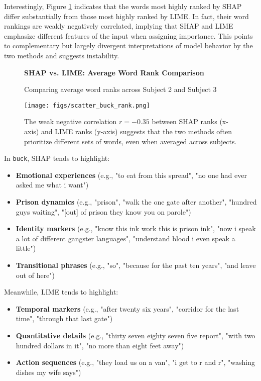 \documentclass[10pt,letterpaper]{article}
\begin{document}
Interestingly, Figure \ref{fig:scatter_buck_2} indicates that the words most highly ranked by SHAP differ substantially from those most highly ranked by LIME. In fact, their word rankings are weakly negatively correlated, implying that SHAP and LIME emphasize different features of the input when assigning importance. This points to complementary but largely divergent interpretations of model behavior by the two methods and suggests instability.

\begin{figure}[ht]
    \centering

    \parbox{\textwidth}{\centering 
        \fontsize{13pt}{13pt}\selectfont \textbf{SHAP vs. LIME: Average Word Rank Comparison}  
        
        {\fontsize{11pt}{13pt}\selectfont Comparing average word ranks across Subject 2 and Subject 3} 
    }
  
    \texttt{[image: figs/scatter\_buck\_rank.png]}
    
    \caption{The weak negative correlation $r = -0.35$ between SHAP ranks (x-axis) and LIME ranks (y-axis) suggests that the two methods often prioritize different sets of words, even when averaged across subjects.}
    \label{fig:scatter_buck_2}
\end{figure}


In \texttt{buck}, SHAP tends to highlight:
\begin{itemize}
	\item \textbf{Emotional experiences} (e.g., "to eat from this spread", "no one had ever asked me what i want")
	\item \textbf{Prison dynamics} (e.g., "prison", "walk the one gate after another", "hundred guys waiting", "[out] of prison they know you on parole")
	\item \textbf{Identity markers} (e.g., "know this ink work this is prison ink", "now i speak a lot of different gangster languages", "understand blood i even speak a little")
	\item \textbf{Transitional phrases} (e.g., "so", "because for the past ten years", "and leave out of here")
\end{itemize}


Meanwhile, LIME tends to highlight:
\begin{itemize}
	\item \textbf{Temporal markers} (e.g., "after twenty six years", "corridor for the last time", "through that last gate")
	\item \textbf{Quantitative details} (e.g., "thirty seven eighty seven five report", "with two hundred dollars in it", "no more than eight feet away")
	\item \textbf{Action sequences} (e.g., "they load us on a van", "i get to r and r", "washing dishes my wife says")
\end{itemize}
\end{document}
